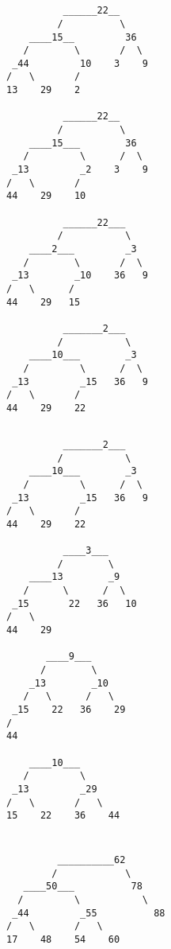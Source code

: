 \documentclass{article}
\begin{document}
    \section{}
    \subsection{}
    \begin{lstlisting}
          ______22__
         /          \
    ____15__         36
   /        \       /  \
 _44         10    3    9
/   \       /
13    29    2

          ______22__
         /          \
    ____15___        36
   /         \      /  \
 _13         _2    3    9
/   \       /
44    29    10

          ______22___
         /           \
    ____2___         _3
   /        \       /  \
 _13        _10    36   9
/   \      /
44    29   15

          _______2___
         /           \
    ____10___        _3
   /         \      /  \
 _13         _15   36   9
/   \       /
44    29    22
    \end{lstlisting}
    \newpage
    \subsection{}
    \begin{lstlisting}           
          _______2___
         /           \
    ____10___        _3
   /         \      /  \
 _13         _15   36   9
/   \       /
44    29    22

          ____3___
         /        \
    ____13        _9
   /      \      /  \
 _15       22   36   10
/   \
44    29

       ____9___
      /        \
    _13        _10
   /   \      /   \
 _15    22   36    29
/
44

    ____10___
   /         \
 _13         _29
/   \       /   \
15    22    36    44
    \end{lstlisting}
    

\section{}
\subsection{}
\begin{lstlisting}
         __________62
        /            \
   ____50___          78
  /         \           \
 _44         _55          88
/   \       /   \
17    48    54    60
\end{lstlisting}
\end{document}
